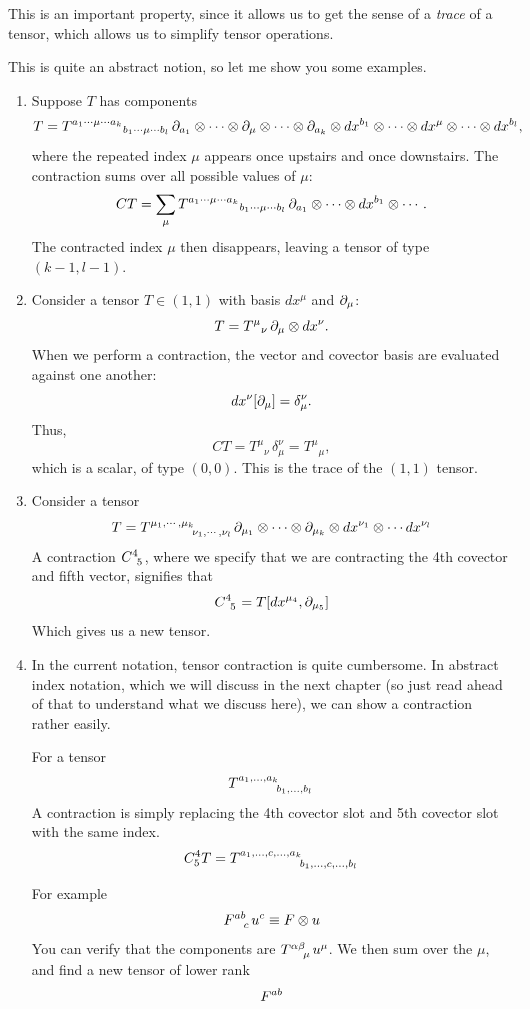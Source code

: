 	This is an important property, since it allows us to get the sense of a \textit{trace}
	of a tensor, which allows us to simplify tensor operations. 

	This is quite an abstract notion, so let me show you some examples.
	\begin{enumerate}[(1)]
		\item 
			Suppose $T$ has components
			\[
				T
				=
				T^{a_1\cdots \mu\cdots a_k}{}_{b_1\cdots \mu\cdots b_l}
				\,
				\partial_{a_1}\otimes\cdots\otimes \partial_\mu\otimes \cdots \otimes\partial_{a_k}
				\otimes
				dx^{b_1}\otimes\cdots\otimes dx^\mu\otimes\cdots\otimes dx^{b_l},
			\]
			where the repeated index $\mu$ appears once upstairs and once
			downstairs. The contraction sums over all possible values of
			$\mu$:
			\[
				CT
				=
				\sum_{\mu}
				T^{a_1\cdots \mu\cdots a_k}{}_{b_1\cdots \mu\cdots b_l}
				\,
				\partial_{a_1}\otimes\cdots
				\otimes
				dx^{b_1}\otimes\cdots.
			\]
			The contracted index $\mu$ then disappears, leaving a tensor of
			type $(k-1,l-1)$.
		\item
			Consider a tensor $T\in(1,1)$ with basis
			$dx^\mu$ and $\partial_\mu$:
			\[
				T = T^\mu{}_\nu\,\partial_\mu\otimes dx^\nu.
			\]
			When we perform a contraction, the vector and covector basis
			are evaluated against one another:
			\[
				dx^\nu[\partial_\mu]=\delta^\nu_\mu.
			\]
			Thus,
			\[
				CT
				=
				T^\mu{}_\nu\,\delta^\nu_\mu
				=
				T^\mu{}_\mu,
			\]
			which is a scalar, of type $(0,0)$. This is the trace of the $(1,1)$ tensor.
		\item
			Consider a tensor 
			\[
				T = \tensor{T}{^{\mu_1,\cdots,\mu_k}_{\nu_1,\cdots,\nu_l}}
				\p_{\mu_1}\otimes\cdots\otimes\p_{\mu_k}\otimes\dd{x^{\nu_1}}\otimes\cdots\dd{x^{\nu_l}}
			\]
			A contraction $\tensor{C}{^4_5}$, where we specify that we are contracting the 4th covector
			and fifth vector, signifies that
			\[
				\tensor{C}{^4_5} = T[dx^{\mu_4}, \p_{\mu_5}]
			\]
			Which gives us a new tensor. 
		\item
			In the current notation, tensor contraction is quite cumbersome. 
			In abstract index notation, which we will discuss in the next chapter (so just read ahead of that 
			to understand what we discuss here), we 
			can show a contraction rather easily.

			For a tensor 
			\[
				\tensor{T}{^{a_1,\ldots,a_k}_{b_1,\ldots,b_l}}
			\]
			A contraction is simply replacing the 4th covector slot and 5th covector slot with the same index.
			\[
				C^4_5 T = \tensor{T}{^{a_1,\ldots,c ,\ldots,a_k}_{b_1,\ldots,c,\ldots,b_l}}
			\]

			For example
			\[
				\tensor{F}{^{ab}_c} u^c \equiv F\otimes u
			\]
			You can verify that the components are $\tensor{T}{^{\alpha\beta}_\mu} u^\mu$. We then sum over the $\mu$, and
			find a new tensor of lower rank
			\[
				\tensor{F}{^{ab}}
			\]
	\end{enumerate}

